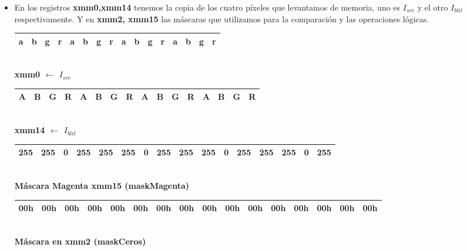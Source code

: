 \begin{itemize}

	\item En los registros \textbf{xmm0,xmm14} tenemos la copia de los cuatro píxeles que levantamos de memoria, uno es $I_{src}$ y el otro $I_{blit}$ respectivamente.
			Y en \textbf{xmm2, xmm15} las máscaras que utilizamos para la comparación y las operaciones lógicas.

		\begin{center}
		   \begin{tabular}{| c | c | c | c || c | c | c | c || c | c | c | c || c | c | c | c |}
			 \hline
			 a & b & g & r & a & b & g & r & a & b & g & r & a & b & g & r \\ \hline
		   \end{tabular}
		   \\ \textbf{xmm0 $\gets$ $I_{src}$ }
		\end{center}

		\begin{center}
		   \begin{tabular}{| c | c | c | c || c | c | c | c || c | c | c | c || c | c | c | c |}
			 \hline
			 A & B & G & R & A & B & G & R & A & B & G & R & A & B & G & R \\ \hline
		   \end{tabular}
		   \\ \textbf{xmm14 $\gets$ $I_{blit}$ }
		\end{center}
		
		 
		\begin{center}
		   \begin{tabular}{| c | c | c | c || c | c | c | c || c | c | c | c || c | c | c | c |}
			 \hline
			 255 & 255 & 0 & 255 & 255 & 255 & 0 & 255 & 255 & 255 & 0 & 255 & 255 & 255 & 0 & 255 \\ \hline
		   \end{tabular}
		   \\  \textbf{Máscara Magenta xmm15 (maskMagenta)}
		\end{center}

		\begin{center}
		   \begin{tabular}{| c | c | c | c || c | c | c | c || c | c | c | c || c | c | c | c |}
			 \hline
			 00h & 00h & 00h & 00h & 00h & 00h & 00h & 00h & 00h & 00h & 00h & 00h & 00h & 00h & 00h & 00h \\ \hline
		   \end{tabular}
		   \\ \textbf{Máscara en xmm2 (maskCeros)}
		\end{center}
		

\end{itemize}
